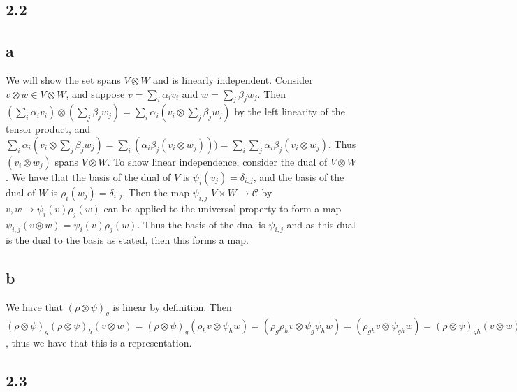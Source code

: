 \documentclass[]{article}
\begin{document}
\subsection*{2.2}
\subsection*{a}
We will show the set spans $V \otimes W$ and is linearly independent.
Consider $v \otimes w \in V \otimes W$, and suppose $v = \sum_i \alpha_i v_i$ and $w = \sum_j \beta_j w_j$. Then $ (\sum_i \alpha_i v_i) \otimes (\sum_j \beta_j w_j) = \sum_i \alpha_i (v_i \otimes \sum_j \beta_j w_j)$ by the left linearity of the tensor product, and $\sum_i \alpha_i (v_i \otimes \sum_j \beta_j w_j) = \sum_i (\alpha_i \beta_j (v_i \otimes w_j))) = \sum_i \sum_j \alpha_i \beta_j (v_i \otimes w_j)$. Thus $(v_i \otimes w_j)$ spans $V \otimes W$. To show linear independence, consider the dual of $V \otimes W$. We have that the basis of the dual of $V$ is $\psi_i(v_j) = \delta_{i, j}$, and the basis of the dual of $W$ is $\rho_i(w_j) = \delta_{i,j}$. Then the map $\psi_{i,j}$ $V \times W \rightarrow \mathcal{C}$ by $v, w \rightarrow \psi_i(v) \rho_j(w)$ can be applied to the universal property to form a map $\psi_{i,j}(v \otimes w) = \psi_i(v) \rho_j(w)$. Thus the basis of the dual is $\psi_{i,j}$ and as this dual is the dual to the basis as stated, then this forms a map. 
\subsection*{b}
We have that $(\rho \otimes \psi)_g$ is linear by definition. Then  $(\rho \otimes \psi)_g (\rho \otimes \psi)_h (v \otimes w) = (\rho \otimes \psi)_g (\rho_h v \otimes \psi_h w) = (\rho_g \rho_h v \otimes \psi_g \psi_h w) = (\rho_{gh} v \otimes \psi_{gh} w) = (\rho \otimes \psi)_{gh} (v \otimes w)$, thus we have that this is a representation.

\subsection*{2.3}
\end{document}
